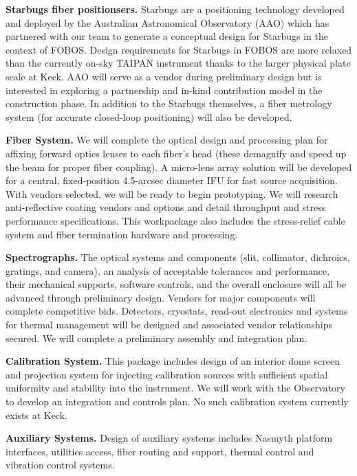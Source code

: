 \documentclass[oneside,11pt]{amsart}
\begin{document}
\noindent \textbf{Starbugs fiber positionsers.} Starbugs are a positioning technology developed and deployed by the
Australian Astronomical Observatory (AAO) which has partnered with our team to generate a conceptual design for
Starbugs in the context of FOBOS.  Design requirements for Starbugs in FOBOS are more relaxed than the currently on-sky
TAIPAN instrument thanks to the larger physical plate scale at Keck.  AAO will serve as a vendor during preliminary
design but is interested in exploring a partnership and in-kind contribution model in the construction phase.  In addition to the Starbugs themselves, a fiber metrology system (for accurate closed-loop positioning) will also be developed.

\noindent \textbf{Fiber System.} We will complete the optical design and processing plan for affixing forward optics
lenses to each fiber's head (these demagnify and speed up the beam for proper fiber coupling).  A micro-lens array
solution will be developed for a central, fixed-position 4.5-arcsec diameter IFU for fast source acquisition.  With vendors selected, we will be ready to begin prototyping.  We will
research anti-reflective coating vendors and options and detail throughput and stress performance specifications.  This
workpackage also includes the stress-relief cable system and fiber termination hardware and processing.

\noindent \textbf{Spectrographs.} The optical systems and components (slit, collimator, dichroics, gratings, and camera), an analysis of acceptable tolerances and performance, their mechanical supports, software controls, and the overall enclosure will all be advanced through preliminary design.  Vendors for major components will complete competitive bids.  Detectors, cryostats, read-out electronics and systems for thermal management will be designed and associated vendor relationships secured. We will complete a preliminary assembly and integration plan.

\noindent \textbf{Calibration System.} This package includes design of an interior dome screen and projection system for injecting calibration sources with sufficient spatial uniformity and stability into the instrument.  We will work with the Observatory to develop an integration and controls plan.  No such calibration system currently exists at Keck.

\noindent \textbf{Auxiliary Systems.} Design of auxiliary systems includes Nasmyth platform interfaces, utilities access, fiber routing and support, thermal control and vibration control systems.
\end{document}
